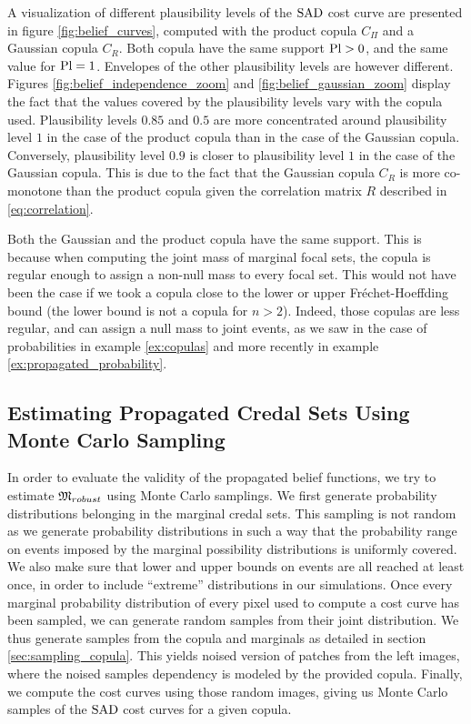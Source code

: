 A visualization of different plausibility levels of the ${\mathrm{SAD}}$ cost curve are presented in figure \ref{fig:belief_curves}, computed with the product copula $C_\Pi$ and a Gaussian copula $C_R$. Both copula have the same support ${\mathrm{Pl}}>0$, and the same value for ${\mathrm{Pl}}=1$. Envelopes of the other plausibility levels are however different. Figures \ref{fig:belief_independence_zoom} and \ref{fig:belief_gaussian_zoom} display the fact that the values covered by the plausibility levels vary with the copula used. Plausibility levels $0.85$ and $0.5$ are more concentrated around plausibility level $1$ in the case of the product copula than in the case of the Gaussian copula. Conversely, plausibility level $0.9$ is closer to plausibility level $1$ in the case of the Gaussian copula. This is due to the fact that the Gaussian copula $C_R$ is more co-monotone than the product copula given the correlation matrix $R$ described in \eqref{eq:correlation}.
\begin{remark}
    Both the Gaussian and the product copula have the same support. This is because when computing the joint mass of marginal focal sets, the copula is regular enough to assign a non-null mass to every focal set. This would not have been the case if we took a copula close to the lower or upper Fréchet-Hoeffding bound (the lower bound is not a copula for $n>2$). Indeed, those copulas are less regular, and can assign a null mass to joint events, as we saw in the case of probabilities in example \ref{ex:copulas} and more recently in example \ref{ex:propagated_probability}.
\end{remark}

\subsection{Estimating Propagated Credal Sets Using Monte Carlo Sampling}\label{sec:montecarlo}
In order to evaluate the validity of the propagated belief functions, we try to estimate ${\mathfrak{M}}_{robust}$ using Monte Carlo samplings. We first generate probability distributions belonging in the marginal credal sets. This sampling is not random as we generate probability distributions in such a way that the probability range on events imposed by the marginal possibility distributions is uniformly covered. We also make sure that lower and upper bounds on events are all reached at least once, in order to include ``extreme'' distributions in our simulations. Once every marginal probability distribution of every pixel used to compute a cost curve has been sampled, we can generate random samples from their joint distribution. We thus generate samples from the copula and marginals as detailed in section \ref{sec:sampling_copula}. This yields noised version of patches from the left images, where the noised samples dependency is modeled by the provided copula. Finally, we compute the cost curves using those random images, giving us Monte Carlo samples of the ${\mathrm{SAD}}$ cost curves for a given copula.

